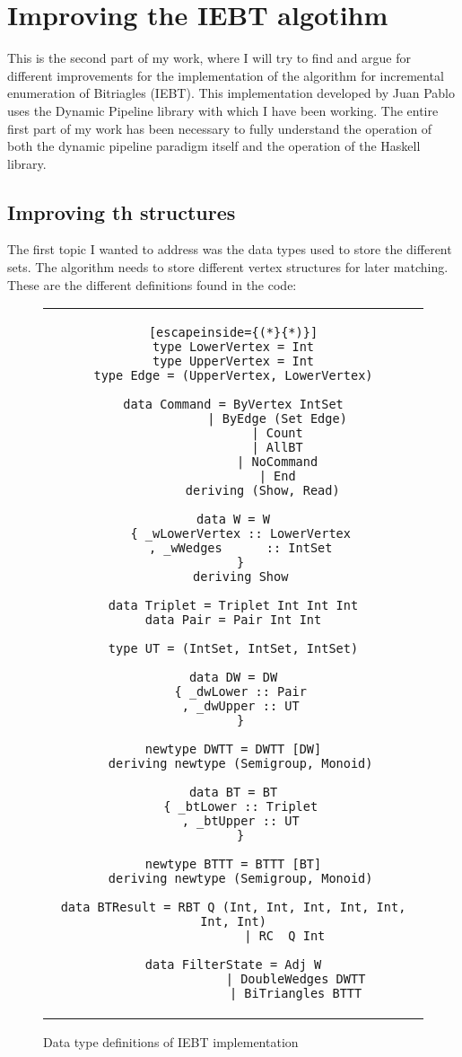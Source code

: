 \chapter{Improving the IEBT algotihm}
This is the second part of my work, where I will try to find and argue for different improvements for the implementation of the algorithm for incremental enumeration of Bitriagles (IEBT).
This implementation developed by Juan Pablo uses the Dynamic Pipeline library with which I have been working.
The entire first part of my work has been necessary to fully understand the operation of both the dynamic pipeline paradigm itself and the operation of the Haskell library.

\section{Improving th structures}
The first topic I wanted to address was the data types used to store the different sets.
The algorithm needs to store different vertex structures for later matching.
These are the different definitions found in the code:

\begin{figure}[ht]
    \begin{tabular}{c}
        \begin{lstlisting}[escapeinside={(*}{*)}]
type LowerVertex = Int
type UpperVertex = Int
type Edge = (UpperVertex, LowerVertex)

data Command = ByVertex IntSet
            | ByEdge (Set Edge)
            | Count
            | AllBT
            | NoCommand
            | End
        deriving (Show, Read)

data W = W
  { _wLowerVertex :: LowerVertex
  , _wWedges      :: IntSet
  }
  deriving Show

data Triplet = Triplet Int Int Int
data Pair = Pair Int Int

type UT = (IntSet, IntSet, IntSet)

data DW = DW
  { _dwLower :: Pair
  , _dwUpper :: UT
  }

newtype DWTT = DWTT [DW]
  deriving newtype (Semigroup, Monoid)

data BT = BT
  { _btLower :: Triplet
  , _btUpper :: UT
  }

newtype BTTT = BTTT [BT]
  deriving newtype (Semigroup, Monoid)

data BTResult = RBT Q (Int, Int, Int, Int, Int, Int, Int)
              | RC  Q Int

data FilterState = Adj W
                 | DoubleWedges DWTT
                 | BiTriangles BTTT
        \end{lstlisting}
    \end{tabular}
    \caption{Data type definitions of IEBT implementation}
    \label{fig:HC40}
\end{figure}


